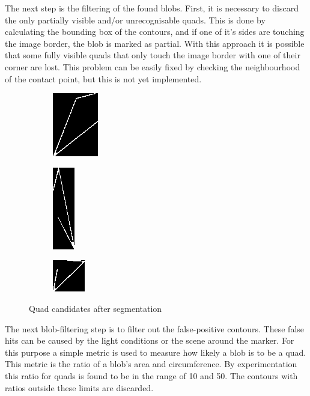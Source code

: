 The next step is the filtering of the found blobs.
First, it is necessary to discard the only partially visible and/or unrecognisable quads.
This is done by calculating the bounding box of the contours, and if one of it's sides are touching the image border, the blob is marked as partial.
With this approach it is possible that some fully visible quads that only touch the image border with one of their corner are lost.
This problem can be easily fixed by checking the neighbourhood of the contact point, but this is not yet implemented.

\begin{figure}[ht]
	\begin{subfigure}{0.3\textwidth}
		\centering
		\includegraphics{figures/quad3.png}
	\end{subfigure}
	\begin{subfigure}{0.3\textwidth}
		\centering
		\includegraphics{figures/quad4.png}
	\end{subfigure}
	\begin{subfigure}{0.3\textwidth}
		\centering
		\includegraphics{figures/quad5.png}
	\end{subfigure}
	\caption{Quad candidates after segmentation}
	\label{fig:segmentationOutput}
\end{figure}

The next blob-filtering step is to filter out the false-positive contours.
These false hits can be caused by the light conditions or the scene around the marker.
For this purpose a simple metric is used to measure how likely a blob is to be a quad. 
This metric is the ratio of a blob's area and circumference. 
By experimentation this ratio for quads is found to be in the range of 10 and 50.
The contours with ratios outside these limits are discarded.

